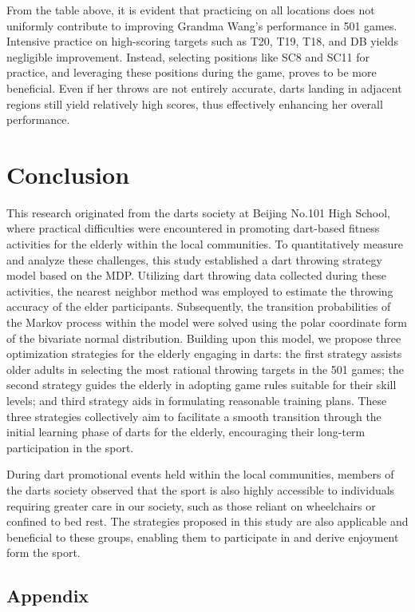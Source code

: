 \documentclass[cjjs]{ipart}
\theoremstyle{plain}
\begin{document}
From the table above, it is evident that practicing on all locations does not uniformly contribute to improving Grandma Wang's performance in 501 games. Intensive practice on high-scoring targets such as T20, T19, T18, and DB yields negligible improvement. Instead, selecting positions like SC8 and SC11 for practice, and leveraging these positions during the game, proves to be more beneficial. Even if her throws are not entirely accurate, darts landing in adjacent regions still yield relatively high scores, thus effectively enhancing her overall performance.

\section{Conclusion}

This research originated from the darts society at Beijing No.101 High School, where practical difficulties were encountered in promoting dart-based fitness activities for the elderly within the local communities. To quantitatively measure and analyze these challenges, this study established a dart throwing strategy model based on the MDP. Utilizing dart throwing data collected during these activities, the nearest neighbor method was employed to estimate the throwing accuracy of the elder participants. Subsequently, the transition probabilities of the Markov process within the model were solved using the polar coordinate form of the bivariate normal distribution. Building upon this model, we propose three optimization strategies for the elderly engaging in darts: the first strategy assists older adults in selecting the most rational throwing targets in the 501 games; the second strategy guides the elderly in adopting game rules suitable for their skill levels; and third strategy aids in formulating reasonable training plans. These three strategies collectively aim to facilitate a smooth transition through the initial learning phase of darts for the elderly, encouraging their long-term participation in the sport.

\text During dart promotional events held within the local communities, members of the darts society observed that the sport is also highly accessible to individuals requiring greater care in our society, such as those reliant on wheelchairs or confined to bed rest. The strategies proposed in this study are also applicable and beneficial to these groups, enabling them to participate in and derive enjoyment form the sport.


\begin{center}
\section*{\large Appendix}
\end{center}
\end{document}
